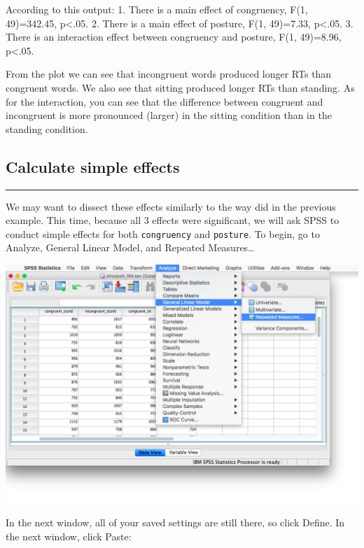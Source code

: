 \documentclass[
]{book}
\begin{document}
According to this output:
1. There is a main effect of congruency, F(1, 49)=342.45, p\textless.05.
2. There is a main effect of posture, F(1, 49)=7.33, p\textless.05.
3. There is an interaction effect between congruency and posture, F(1, 49)=8.96, p\textless.05.

From the plot we can see that incongruent words produced longer RTs than congruent words. We also see that sitting produced longer RTs than standing. As for the interaction, you can see that the difference between congruent and incongruent is more pronounced (larger) in the sitting condition than in the standing condition.

\hypertarget{calculate-simple-effects-1}{%
\subsection{Calculate simple effects}\label{calculate-simple-effects-1}}

\begin{center}\rule{0.5\linewidth}{0.5pt}\end{center}

We may want to dissect these effects similarly to the way did in the previous example. This time, because all 3 effects were significant, we will ask SPSS to conduct simple effects for both \texttt{congruency} and \texttt{posture}. To begin, go to {Analyze}, {General Linear Model}, and {Repeated Measures\ldots{}}

\includegraphics{img/10.4.32.png}

In the next window, all of your saved settings are still there, so click {Define}. In the next window, click {Paste}:
\end{document}
